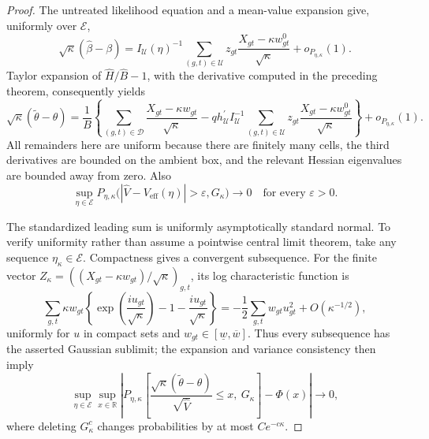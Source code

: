 \documentclass{article}
\begin{document}
\begin{proof}
The untreated likelihood equation and a mean-value expansion give,
uniformly over \(\mathcal E\),
\[
 \sqrt\kappa(\widehat\beta-\beta)
 =I_{\mathcal U}(\eta)^{-1}
    \sum_{(g,t)\in\mathcal U}
       z_{gt}\frac{X_{gt}-\kappa w^0_{gt}}{\sqrt\kappa}
   +o_{P_{\eta,\kappa}}(1).
\]
Taylor expansion of \(\widehat H/\widehat B-1\), with the derivative
computed in the preceding theorem, consequently yields
\[
 \sqrt\kappa(\widetilde\theta-\theta)
 =\frac{1}{B}\left\{
    \sum_{(g,t)\in\mathcal D}
       \frac{X_{gt}-\kappa w_{gt}}{\sqrt\kappa}
    -q h_{\mathcal U}^{\prime}I_{\mathcal U}^{-1}
       \sum_{(g,t)\in\mathcal U}
          z_{gt}\frac{X_{gt}-\kappa w^0_{gt}}{\sqrt\kappa}
  \right\}+o_{P_{\eta,\kappa}}(1).
\]
All remainders here are uniform because there are finitely many cells, the
third derivatives are bounded on the ambient box, and the relevant Hessian
eigenvalues are bounded away from zero.  Also
\[
 \sup_{\eta\in\mathcal E}
 P_{\eta,\kappa}\bigl(|\widehat V-V_{\mathrm{eff}}(\eta)|>\varepsilon,
 G_\kappa\bigr)\longrightarrow0
 \quad\text{for every }\varepsilon>0.
\]

The standardized leading sum is uniformly asymptotically standard normal.
To verify uniformity rather than assume a pointwise central limit theorem,
take any sequence \(\eta_\kappa\in\mathcal E\).  Compactness gives a
convergent subsequence.  For the finite vector
\(Z_\kappa=((X_{gt}-\kappa w_{gt})/\sqrt\kappa)_{g,t}\), its log
characteristic function is
\[
 \sum_{g,t}\kappa w_{gt}
 \left\{
   \exp\left(\frac{i u_{gt}}{\sqrt\kappa}\right)
       -1-\frac{i u_{gt}}{\sqrt\kappa}
 \right\}
 =-\frac12\sum_{g,t}w_{gt}u_{gt}^2+O(\kappa^{-1/2}),
\]
uniformly for \(u\) in compact sets and \(w_{gt}\in[\underline w,\overline w]\).
Thus every subsequence has the asserted Gaussian sublimit; the expansion
and variance consistency then imply
\[
 \sup_{\eta\in\mathcal E}\sup_{x\in\mathbb R}
 \left|
 P_{\eta,\kappa}\left[
  \frac{\sqrt\kappa(\widetilde\theta-\theta)}{\sqrt{\widehat V}}
       \leq x,\ G_\kappa
 \right]-\Phi(x)
 \right|\longrightarrow0,
\]
where deleting \(G_\kappa^c\) changes probabilities by at most
\(Ce^{-c\kappa}\).


\end{proof}
\end{document}
